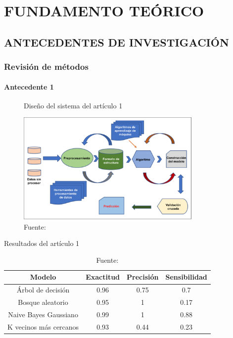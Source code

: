 \chapter{FUNDAMENTO TEÓRICO}


\section{ANTECEDENTES DE INVESTIGACIÓN}

\subsection{Revisión de métodos}

\subsubsection{Antecedente 1}

\lipsum[1]

\begin{figure}[H]
    \centering
    \caption{Diseño del sistema del artículo 1}
    \includegraphics[width=0.8\textwidth]{E_IMAGENES/1_Capitulo2/1-research-background/Paper_1_1.pdf}
    \caption*{Fuente: \citet{9276955}}
    \label{fig:Imagen_1}
\end{figure}

\lipsum[2]

\begin{table}[H]
    \centering
    \caption{Resultados del artículo 1}
    \begin{tabular}{cccc}
        \hline
        \textbf{Modelo} & \textbf{Exactitud} & \textbf{Precisión} & \textbf{Sensibilidad} \\
        \hline
        Árbol de
        decisión        & 0.96               & 0.75               & 0.7                   \\
        \hline
        Bosque
        aleatorio       & 0.95               & 1                  & 0.17                  \\
        \hline
        Naive Bayes
        Gaussiano       & 0.99               & 1                  & 0.88                  \\
        \hline
        K vecinos más
        cercanos        & 0.93               & 0.44               & 0.23                  \\
        \hline
    \end{tabular}
    \caption*{Fuente: \citet{9276955}}
    \label{tab:Paper_1_3}
\end{table}


